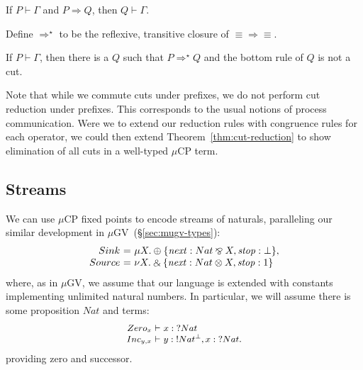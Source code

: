 \documentclass[orivec,envcountsame]{llncs}
\makeatletter
\newcommand{\with}{\mathbin\binampersand}
\newcommand{\parr}{\mathbin\bindnasrepma}
\newcommand{\cpdual}[1]{#1^\perp}
\newcommand{\cpbang}[1]{{! #1}}
\newcommand{\cpquery}[1]{{? #1}}
\newcommand{\cptyp}[2]{#1 \vdash #2}
\newcommand{\clabel}[1]{\mathit{#1}}
\newcommand{\mucp}{$\mu\mathrm{CP}$\xspace}
\newcommand{\mugv}{$\mu\mathrm{GV}$\xspace}
\newcommand{\ba}{\begin{array}}
\newcommand{\ea}{\end{array}}
\newenvironment{equations}{\[\ba{@{}r@{~}c@{~}l@{}}}{\ea\]}
\newenvironment{eqs}{\ba{@{}r@{~}c@{~}l@{}}}{\ea}
\newcommand{\secref}[1]{(\S\ref{sec:#1})}
\makeatother
\begin{document}
\begin{theorem}
  If $\cptyp{P}{\Gamma}$ and $P \Longrightarrow Q$, then $\cptyp{Q}{\Gamma}.$
\end{theorem}

Define $\Longrightarrow^\star$ to be the reflexive, transitive closure of $\equiv\Longrightarrow\equiv$.

\begin{theorem}\label{thm:cut-reduction}
  If $\cptyp{P}{\Gamma}$, then there is a $Q$ such that $P \Longrightarrow^\star Q$ and the bottom
  rule of $Q$ is not a cut.
\end{theorem}

Note that while we commute cuts under prefixes, we do not perform cut reduction under prefixes.
This corresponds to the usual notions of process communication.  Were we to extend our reduction
rules with congruence rules for each operator, we could then extend Theorem~\ref{thm:cut-reduction}
to show elimination of all cuts in a well-typed \mucp term.

\subsection{Streams}

We can use \mucp fixed points to encode streams of naturals, paralleling our similar development in
\mugv~\secref{mugv-types}: %
\begin{equations}
  Sink &=& \mu X. \oplus \{ \clabel{next}: Nat \parr X, \clabel{stop}: \bot \}, \\
  Source &=& \nu X. \with \{ \clabel{next}: Nat \otimes X, \clabel{stop}: 1 \} \\
\end{equations}%
where, as in \mugv, we assume that our language is extended with constants implementing unlimited
natural numbers. In particular, we will assume there is some proposition $Nat$ and terms:
\[\small\begin{eqs}
Zero_x &\vdash& x:\cpquery{Nat} \\
Inc_{y,x} &\vdash& y:\cpbang{\cpdual{Nat}},x:\cpquery{Nat}.
\end{eqs}\]
providing zero and successor.

\end{document}
